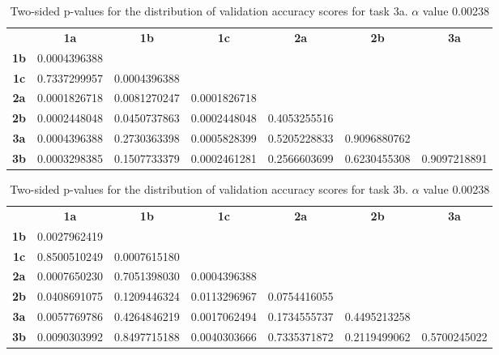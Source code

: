 \newpage

\begin{table}[h!]
    \centering
    \begin{tabular}{ccccccc}
                & \textbf{1a}        & \textbf{1b}        & \textbf{1c}        & \textbf{2a}  & \textbf{2b}  & \textbf{3a}  \\
    \textbf{1b} & 0.0004396388 &                    &                    &              &              &              \\
    \textbf{1c} & 0.7337299957 & 0.0004396388       &                    &              &              &              \\
    \textbf{2a} & 0.0001826718 & 0.0081270247       & 0.0001826718       &              &              &              \\
    \textbf{2b} & 0.0002448048 & 0.0450737863       & 0.0002448048       & 0.4053255516 &              &              \\
    \textbf{3a} & 0.0004396388 & 0.2730363398       & 0.0005828399       & 0.5205228833 & 0.9096880762 &              \\
    \textbf{3b} & 0.0003298385 & 0.1507733379       & 0.0002461281       & 0.2566603699 & 0.6230455308 & 0.9097218891
    \end{tabular}
    \caption[p-table for validation accuracy (task 3a)]{Two-sided p-values for the distribution of validation accuracy scores for task 3a. \(\alpha\) value 0.00238}
    \label{tab:exp2.validation3a}
\end{table}

\begin{table}[h!]
    \centering
    \begin{tabular}{ccccccc}
                & \textbf{1a}        & \textbf{1b}        & \textbf{1c}        & \textbf{2a}  & \textbf{2b}  & \textbf{3a}  \\
    \textbf{1b} & 0.0027962419       &                    &                    &              &              &              \\
    \textbf{1c} & 0.8500510249       & 0.0007615180       &                    &              &              &              \\
    \textbf{2a} & 0.0007650230       & 0.7051398030       & 0.0004396388       &              &              &              \\
    \textbf{2b} & 0.0408691075       & 0.1209446324       & 0.0113296967       & 0.0754416055 &              &              \\
    \textbf{3a} & 0.0057769786       & 0.4264846219       & 0.0017062494       & 0.1734555737 & 0.4495213258 &              \\
    \textbf{3b} & 0.0090303992       & 0.8497715188       & 0.0040303666       & 0.7335371872 & 0.2119499062 & 0.5700245022
    \end{tabular}
    \caption[p-table for validation accuracy (task 3b)]{Two-sided p-values for the distribution of validation accuracy scores for task 3b. \(\alpha\) value 0.00238}
    \label{tab:exp2.validation3b}
\end{table}

